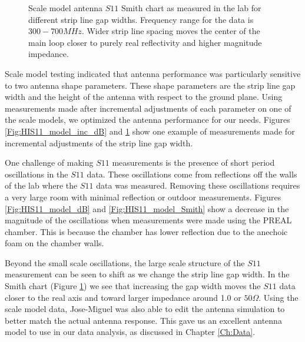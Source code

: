 \begin{figure}[htb]
\begin{minipage}[b]{0.47\textwidth}
\caption{Scale model antenna $S11$ Smith chart as measured in the lab for different strip line gap widths. Frequency range for the data is $300-700 MHz$. Wider strip line spacing moves the center of the main loop closer to purely real reflectivity and higher magnitude impedance. }
\label{Fig:HIS11_model_inc_Smith}
\end{minipage}
\end{figure}

Scale model testing indicated that antenna performance was particularly sensitive to two antenna shape parameters. These shape parameters are the strip line gap width and the height of the antenna with respect to the ground plane. Using measurements made after incremental adjustments of each parameter on one of the scale models, we optimized the antenna performance for our needs. Figures \ref{Fig:HIS11_model_inc_dB} and \ref{Fig:HIS11_model_inc_Smith} show one example of measurements made for incremental adjustments of the strip line gap width. 

One challenge of making $S11$ measurements is the presence of short period oscillations in the $S11$ data. These oscillations come from reflections off the walls of the lab where the $S11$ data was measured. Removing these oscillations requires a very large room with minimal reflection or outdoor measurements. Figures \ref{Fig:HIS11_model_dB} and \ref{Fig:HIS11_model_Smith} show a decrease in the magnitude of the oscillations when measurements were made using the PREAL chamber. This is because the chamber has lower reflection due to the anechoic foam on the chamber walls. 

Beyond the small scale oscillations, the large scale structure of the $S11$ measurement can be seen to shift as we change the strip line gap width. In the Smith chart (Figure \ref{Fig:HIS11_model_inc_Smith}) we see that increasing the gap width moves the $S11$ data closer to the real axis and toward larger impedance around 1.0 or $50 \Omega$. Using the scale model data, Jose-Miguel was also able to edit the antenna simulation to better match the actual antenna response. This gave us an excellent antenna model to use in our data analysis, as discussed in Chapter \ref{Ch:Data}. 

